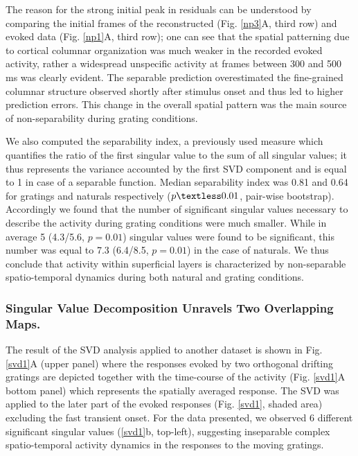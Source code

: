 The reason for the strong initial peak in residuals can be understood by
comparing the initial frames of the reconstructed (Fig. \ref{np3}A, third row)
and evoked data (Fig. \ref{np1}A, third row); one can see that the spatial
patterning due to cortical columnar organization was much weaker in the
recorded evoked activity, rather a widespread unspecific activity at frames
between 300 and 500 ms was clearly evident. The separable prediction
overestimated the fine-grained columnar structure observed shortly after
stimulus onset and thus led to higher prediction errors. This change in the
overall spatial pattern was the main source of non-separability during
grating conditions. 

We also computed the separability index, a previously used measure
\citep{escabi2003a} which quantifies the ratio of the first singular value
to the sum of all singular values; it thus represents the variance
accounted by the first SVD component and is equal to 1 in case of a
separable function. Median separability index was 0.81 and 0.64 for
gratings and naturals respectively ($p \textless 0.01$, pair-wise
bootstrap).  Accordingly we found that the number of significant singular
values necessary to describe the activity during grating conditions were
much smaller. While in average 5 (4.3/5.6, $p = 0.01$) singular values were
found to be significant, this number was equal to 7.3 (6.4/8.5, $p = 0.01$)
in the case of naturals. We thus conclude that activity within superficial
layers is characterized by non-separable spatio-temporal dynamics during
both natural and grating conditions.


\subsubsection{Singular Value Decomposition Unravels Two Overlapping Maps.
} \label{oi_svdgrat}


The result of the SVD analysis applied to another dataset is shown in Fig.
\ref{svd1}A (upper panel) where the responses evoked by two orthogonal
drifting gratings are depicted together with the time-course of the
activity (Fig. \ref{svd1}A bottom panel) which represents the spatially
averaged response. The SVD was applied to the later part of the evoked
responses (Fig. \ref{svd1}, shaded area) excluding the fast transient
onset. For the data presented, we observed 6 different significant singular
values (\ref{svd1}b, top-left), suggesting inseparable complex
spatio-temporal activity dynamics in the responses to the moving gratings. 

